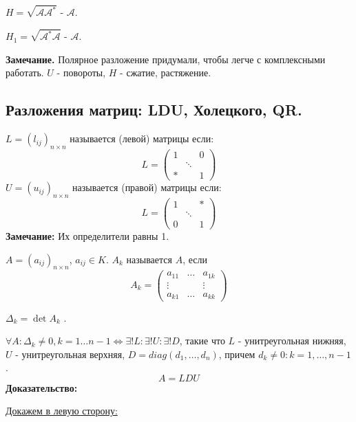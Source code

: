 $H  =\sqrt{\mathcal{A}\mathcal{A}^*}$ -  $\mathcal{A}$.

$H_1  =\sqrt{\mathcal{A}^*\mathcal{A}}$ -  $\mathcal{A}$.



\textbf{Замечание.} Полярное разложение придумали, чтобы легче с комплексными работать. $U$ - повороты, $H$ - сжатие, растяжение.

\pagebreak
\subsection{Разложения матриц: LDU, Холецкого, QR.}

 $L = (l_{ij})_{n\times n}$  называется  (левой) матрицы если:
$$L = \begin{pmatrix}
    1 & & 0\\
    & \ddots & \\
    * &  & 1
\end{pmatrix}$$
 $U = (u_{ij})_{n\times n}$  называется  (правой) матрицы если:
$$L = \begin{pmatrix}
    1 & & *\\
    & \ddots & \\
    0 &  & 1
\end{pmatrix}$$
\textbf{Замечание:} Их определители равны 1.

 $A = (a_{ij})_{n \times n}$, $a_{ij} \in K$. $A_k$ называется  $A$, если
$$A_k = \begin{pmatrix}
    a_{11} & \ldots & a_{1k}\\
    \vdots & & \vdots \\
    a_{k1} & \ldots & a_{kk}
\end{pmatrix}$$

$\Delta_k = \det A_k $ .



$\forall A : \Delta_k \neq 0 , k = 1\ldots n-1 \Leftrightarrow \exists ! L : \exists! U: \exists ! D $, такие что $L$ - унитреугольная нижняя, $U$ - унитреугольная верхняя, $D = diag (d_1,\ldots, d_n)$, причем $d_k \neq 0: k = 1,\ldots,n-1$.
$$A = LDU$$
\textbf{Доказательство:}

    \uline{Докажем в левую сторону:}

